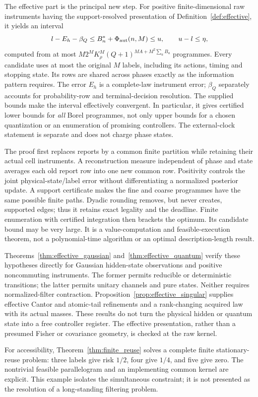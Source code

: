 The effective part is the principal new step. For positive finite-dimensional raw instruments having the support-resolved presentation of Definition~\ref{def:effective}, it yields an interval
\[
 l-E_h-\beta_Q\le B_n^*+\Phi_{\mathrm{aut}}(n,M)\le u,
 \qquad u-l\le\eta,
\]
computed from at most $M2^M K_\rho^M(Q+1)^{MA+M^2\sum_a B_a}$ programmes. Every candidate uses at most the original $M$ labels, including its actions, timing and stopping state. Its rows are shared across phases exactly as the information pattern requires. The error $E_h$ is a complete-law instrument error; $\beta_Q$ separately accounts for probability-row and terminal-decision resolution. The supplied bounds make the interval effectively convergent. In particular, it gives certified lower bounds for \emph{all} Borel programmes, not only upper bounds for a chosen quantization or an enumeration of promising controllers. The external-clock statement is separate and does not charge phase states.

The proof first replaces reports by a common finite partition while retaining their actual cell instruments. A reconstruction measure independent of phase and state averages each old report row into one new common row. Positivity controls the joint physical-state/label error without differentiating a normalized posterior update. A support certificate makes the fine and coarse programmes have the same possible finite paths. Dyadic rounding removes, but never creates, supported edges; thus it retains exact legality and the deadline. Finite enumeration with certified integration then brackets the optimum. Its candidate bound may be very large. It is a value-computation and feasible-execution theorem, not a polynomial-time algorithm or an optimal description-length result.

Theorems~\ref{thm:effective_gaussian} and~\ref{thm:effective_quantum} verify these hypotheses directly for Gaussian hidden-state observations and positive noncommuting instruments. The former permits reducible or deterministic transitions; the latter permits unitary channels and pure states. Neither requires normalized-filter contraction. Proposition~\ref{prop:effective_singular} supplies effective Cantor and atomic-tail refinements and a rank-changing acquired law with its actual masses. These results do not turn the physical hidden or quantum state into a free controller register. The effective presentation, rather than a presumed Fisher or covariance geometry, is checked at the raw kernel.

For accessibility, Theorem~\ref{thm:finite_reuse} solves a complete finite stationary-reuse problem: three labels give risk $1/2$, four give $1/4$, and five give zero. The nontrivial feasible parallelogram and an implementing common kernel are explicit. This example isolates the simultaneous constraint; it is not presented as the resolution of a long-standing filtering problem.

